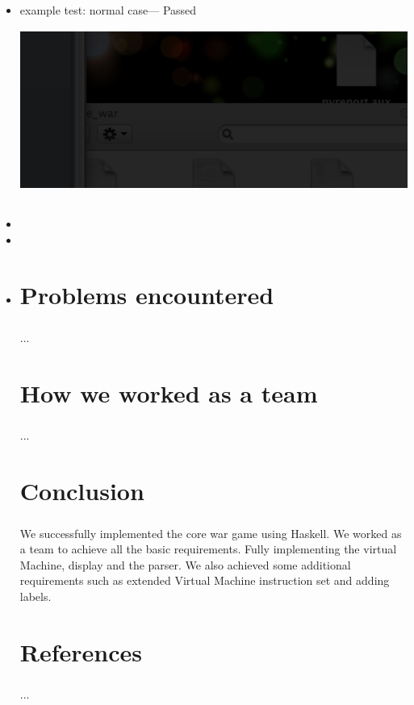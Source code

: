 \documentclass{report}
\begin{document}
		\begin{itemize}
			\item example test: normal case--- Passed \newline \newline \includegraphics[height=60mm]{test}
			\item
			\item
			\item
			
			
\chapter{Problems encountered }
	\paragraph{}...

\chapter{How we worked as a team}
	\paragraph{}...
	
\chapter{Conclusion}
	\paragraph{} We successfully implemented the core war game using Haskell. We worked as a team to achieve all the basic requirements. Fully implementing the virtual Machine, display and the parser. We also achieved some additional requirements such as extended Virtual Machine instruction set and adding labels. 

\chapter{References}
	\paragraph{}...			
			
\end{itemize}
\end{document}
